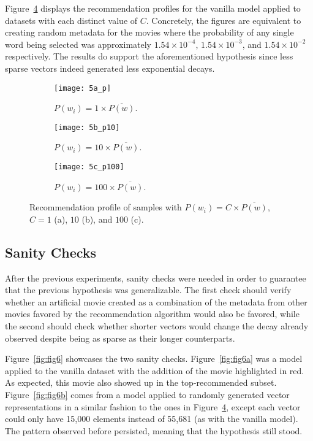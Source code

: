 Figure~\ref{fig:fig5} displays the recommendation profiles for the vanilla model
applied to datasets with each distinct value of $C$. Concretely, the figures are
equivalent to creating random metadata for the movies where the probability of
any single word being selected was approximately $1.54 \times 10^{-4}$, $1.54
\times 10^{-3}$, and $1.54 \times 10^{-2}$ respectively. The results do support
the aforementioned hypothesis since less sparse vectors indeed generated less
exponential decays.

\begin{figure}
  \centering
  \begin{subfigure}{0.3\textwidth}
    \centering
    \texttt{[image: 5a\_p]}
    \caption{$P(w_{i}) = 1 \times \overline{P(w)}$.\label{fig:fig5a}}
  \end{subfigure}
  \begin{subfigure}{0.3\textwidth}
    \centering
    \texttt{[image: 5b\_p10]}
    \caption{$P(w_{i}) = 10 \times \overline{P(w)}$.\label{fig:fig5b}}
  \end{subfigure}
  \begin{subfigure}{0.3\textwidth}
    \centering
    \texttt{[image: 5c\_p100]}
    \caption{$P(w_{i}) = 100 \times \overline{P(w)}$.\label{fig:fig5c}}
  \end{subfigure}
  \caption{Recommendation profile of samples with
    $P(w_{i}) = C \times \overline{P(w)}$, $C = 1$ (a), $10$ (b), and $100$
    (c).\label{fig:fig5}}
\end{figure}

\subsection{Sanity Checks}
\label{subsec:sanity03}

After the previous experiments, sanity checks were needed in order to guarantee
that the previous hypothesis was generalizable. The first check should verify
whether an artificial movie created as a combination of the metadata from other
movies favored by the recommendation algorithm would also be favored, while the
second should check whether shorter vectors would change the decay already
observed despite being as sparse as their longer counterparts.

Figure~\ref{fig:fig6} showcases the two sanity checks. Figure~\ref{fig:fig6a}
was a model applied to the vanilla dataset with the addition of the movie
highlighted in red. As expected, this movie also showed up in the
top-recommended subset. Figure~\ref{fig:fig6b} comes from a model applied to
randomly generated vector representations in a similar fashion to the ones in
Figure~\ref{fig:fig5}, except each vector could only have 15,000 elements
instead of 55,681 (as with the vanilla model). The pattern observed before
persisted, meaning that the hypothesis still stood.

